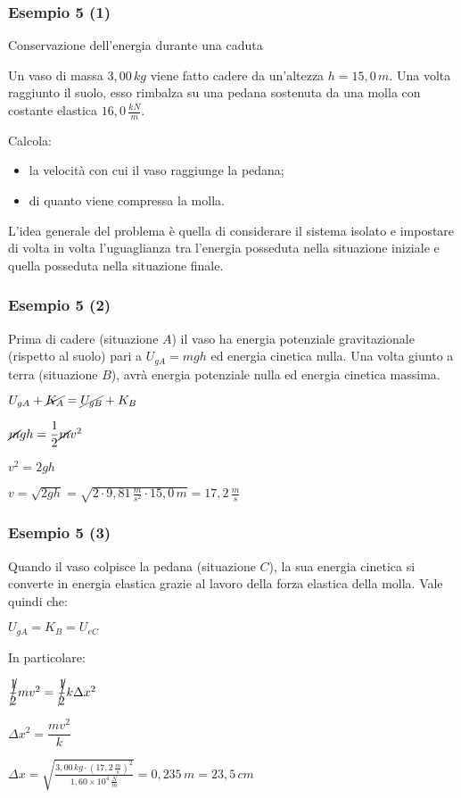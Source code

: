 \documentclass[]{beamer}
\theoremstyle{plain}
\begin{document}
\begin{frame}
  \frametitle{Esempio 5 (1)}
  \begin{exampleblock}{Conservazione dell'energia durante una caduta}
{\small Un vaso di massa $ 3,00 \, kg $ viene fatto cadere da un'altezza $h = 15,0 \, m $. Una volta raggiunto il suolo, esso rimbalza su una pedana sostenuta da una molla con costante elastica $ 16,0 \, \frac{kN}{m} $.

Calcola:
\begin{itemize}
  \item la velocità con cui il vaso raggiunge la pedana;
  \item di quanto viene compressa la molla.
\end{itemize}}
\end{exampleblock}
  \pause
  L'idea generale del problema è quella di considerare il sistema isolato e impostare di volta in volta l'uguaglianza tra l'energia posseduta nella situazione iniziale e quella posseduta nella situazione finale.
\end{frame}



\begin{frame}
  \frametitle{Esempio 5 (2)}
  Prima di cadere (situazione $ A $) il vaso ha energia potenziale gravitazionale (rispetto al suolo) pari a $ U_{gA} = mgh $ ed energia cinetica nulla. Una volta giunto a terra (situazione $ B $), avrà energia potenziale nulla ed energia cinetica massima.\pause
  \begin{center}
  $ U_{gA} + \cancel{K_A} = \cancel{U_{gB}} + K_B $
  \end{center}\pause
  \begin{center}
    $ \cancel{m}gh = \dfrac{1}{2}\cancel{m}v^2 $
  \end{center}\pause
  \begin{center}
  $ v^2 = 2gh $
  \end{center}\pause
  \begin{center}
  $ v = \sqrt{2gh} = \sqrt{2 \cdot 9,81 \, \frac{m}{s^2}\cdot 15,0 \, m} = 17,2 \, \frac{m}{s}$
  \end{center}
\end{frame}

\begin{frame}
  \frametitle{Esempio 5 (3)}
Quando il vaso colpisce la pedana (situazione $ C $), la sua energia cinetica si converte in energia elastica grazie al lavoro della forza elastica della molla. Vale quindi che:
  \begin{center}
  $ U_{gA} = K_B = U_{eC} $
  \end{center}\pause
  In particolare:
  \begin{center}
    $ \cancel{\dfrac{1}{2}}mv^2 = \cancel{\dfrac{1}{2}}k\Delta x^2 $
  \end{center}\pause
  \begin{center}
  $ \Delta x^2 = \dfrac{mv^2}{k} $
  \end{center}\pause
  \begin{center}
  $ \Delta x = \sqrt{\frac{3,00 \, kg \cdot \left( 17,2 \, \frac{m}{s} \right)^2}{1,60 \times 10^4 \, \frac{N}{m}}} = 0,235 \, m = 23,5 \, cm  $
  \end{center}
\end{frame}
\end{document}
